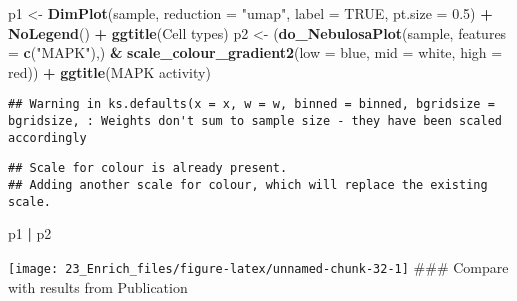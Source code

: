 \documentclass[
]{article}
\newenvironment{Shaded}{\begin{snugshade}}{\end{snugshade}}
\newcommand{\AttributeTok}[1]{\textcolor[rgb]{0.13,0.29,0.53}{#1}}
\newcommand{\ConstantTok}[1]{\textcolor[rgb]{0.56,0.35,0.01}{#1}}
\newcommand{\FloatTok}[1]{\textcolor[rgb]{0.00,0.00,0.81}{#1}}
\newcommand{\FunctionTok}[1]{\textcolor[rgb]{0.13,0.29,0.53}{\textbf{#1}}}
\newcommand{\NormalTok}[1]{#1}
\newcommand{\OtherTok}[1]{\textcolor[rgb]{0.56,0.35,0.01}{#1}}
\newcommand{\SpecialCharTok}[1]{\textcolor[rgb]{0.81,0.36,0.00}{\textbf{#1}}}
\newcommand{\StringTok}[1]{\textcolor[rgb]{0.31,0.60,0.02}{#1}}
\begin{document}
\begin{Shaded}
\begin{Highlighting}[]
\NormalTok{p1 }\OtherTok{\textless{}{-}} \FunctionTok{DimPlot}\NormalTok{(sample, }\AttributeTok{reduction =} \StringTok{"umap"}\NormalTok{, }\AttributeTok{label =} \ConstantTok{TRUE}\NormalTok{, }\AttributeTok{pt.size =} \FloatTok{0.5}\NormalTok{) }\SpecialCharTok{+} 
  \FunctionTok{NoLegend}\NormalTok{() }\SpecialCharTok{+} \FunctionTok{ggtitle}\NormalTok{(}\StringTok{\textquotesingle{}Cell types\textquotesingle{}}\NormalTok{)}
\NormalTok{p2 }\OtherTok{\textless{}{-}}\NormalTok{ (}\FunctionTok{do\_NebulosaPlot}\NormalTok{(sample, }\AttributeTok{features =} \FunctionTok{c}\NormalTok{(}\StringTok{"MAPK"}\NormalTok{),) }\SpecialCharTok{\&} 
  \FunctionTok{scale\_colour\_gradient2}\NormalTok{(}\AttributeTok{low =} \StringTok{\textquotesingle{}blue\textquotesingle{}}\NormalTok{, }\AttributeTok{mid =} \StringTok{\textquotesingle{}white\textquotesingle{}}\NormalTok{, }\AttributeTok{high =} \StringTok{\textquotesingle{}red\textquotesingle{}}\NormalTok{)) }\SpecialCharTok{+}
  \FunctionTok{ggtitle}\NormalTok{(}\StringTok{\textquotesingle{}MAPK activity\textquotesingle{}}\NormalTok{)}
\end{Highlighting}
\end{Shaded}

\begin{verbatim}
## Warning in ks.defaults(x = x, w = w, binned = binned, bgridsize = bgridsize, : Weights don't sum to sample size - they have been scaled accordingly
\end{verbatim}

\begin{verbatim}
## Scale for colour is already present.
## Adding another scale for colour, which will replace the existing scale.
\end{verbatim}

\begin{Shaded}
\begin{Highlighting}[]
\NormalTok{p1 }\SpecialCharTok{|}\NormalTok{ p2}
\end{Highlighting}
\end{Shaded}

\texttt{[image: 23\_Enrich\_files/figure-latex/unnamed-chunk-32-1]}
\#\#\# Compare with results from Publication
\end{document}
